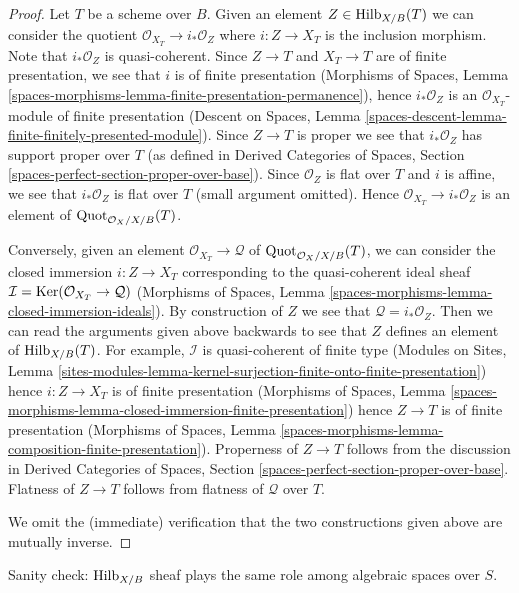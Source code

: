 \begin{proof}
Let $T$ be a scheme over $B$. Given an element
$Z \in \mathrm{Hilb}_{X/B}(T)$ we can consider the
quotient $\mathcal{O}_{X_T} \to i_*\mathcal{O}_Z$
where $i : Z \to X_T$ is the inclusion morphism.
Note that $i_*\mathcal{O}_Z$ is quasi-coherent.
Since $Z \to T$ and $X_T \to T$ are of finite presentation,
we see that $i$ is of finite presentation (Morphisms of Spaces, Lemma
\ref{spaces-morphisms-lemma-finite-presentation-permanence}), hence
$i_*\mathcal{O}_Z$ is an $\mathcal{O}_{X_T}$-module of
finite presentation (Descent on Spaces, Lemma
\ref{spaces-descent-lemma-finite-finitely-presented-module}).
Since $Z \to T$ is proper we see that $i_*\mathcal{O}_Z$
has support proper over $T$ (as defined in
Derived Categories of Spaces, Section
\ref{spaces-perfect-section-proper-over-base}).
Since $\mathcal{O}_Z$ is flat
over $T$ and $i$ is affine, we see that $i_*\mathcal{O}_Z$
is flat over $T$ (small argument omitted). Hence
$\mathcal{O}_{X_T} \to i_*\mathcal{O}_Z$
is an element of $\mathrm{Quot}_{\mathcal{O}_X/X/B}(T)$.

\medskip\noindent
Conversely, given an element $\mathcal{O}_{X_T} \to \mathcal{Q}$
of $\mathrm{Quot}_{\mathcal{O}_X/X/B}(T)$, we can consider
the closed immersion $i : Z \to X_T$ corresponding to
the quasi-coherent ideal sheaf
$\mathcal{I} = \mathop{\mathrm{Ker}}(\mathcal{O}_{X_T} \to \mathcal{Q})$
(Morphisms of Spaces, Lemma
\ref{spaces-morphisms-lemma-closed-immersion-ideals}).
By construction of $Z$ we see that $\mathcal{Q} = i_*\mathcal{O}_Z$.
Then we can read the arguments given above backwards to see
that $Z$ defines an element of $\mathrm{Hilb}_{X/B}(T)$.
For example, $\mathcal{I}$ is quasi-coherent of finite type
(Modules on Sites, Lemma
\ref{sites-modules-lemma-kernel-surjection-finite-onto-finite-presentation})
hence $i : Z \to X_T$ is of finite presentation
(Morphisms of Spaces, Lemma
\ref{spaces-morphisms-lemma-closed-immersion-finite-presentation})
hence $Z \to T$ is of finite presentation
(Morphisms of Spaces, Lemma
\ref{spaces-morphisms-lemma-composition-finite-presentation}).
Properness of $Z \to T$ follows from the discussion in
Derived Categories of Spaces, Section
\ref{spaces-perfect-section-proper-over-base}.
Flatness of $Z \to T$ follows from flatness of $\mathcal{Q}$ over $T$.

\medskip\noindent
We omit the (immediate) verification that the two constructions given
above are mutually inverse.
\end{proof}

\noindent
Sanity check: $\mathrm{Hilb}_{X/B}$
sheaf plays the same role among algebraic spaces over $S$.

